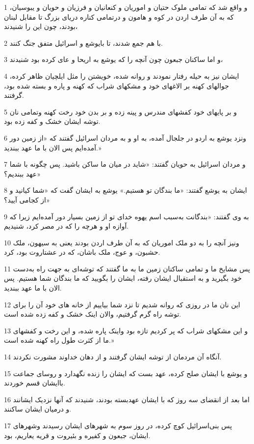 \par 1 و واقع شد که تمامی ملوک حتیان و اموریان و کنعانیان و فرزیان و حویان و یبوسیان، که به آن طرف اردن در کوه و هامون و درتمامی کناره دریای بزرگ تا مقابل لبنان بودند، چون این را شنیدند،
\par 2 با هم جمع شدند، تا بایوشع و اسرائیل متفق جنگ کنند.
\par 3 و اما ساکنان جبعون چون آنچه را که یوشع به اریحا و عای کرده بود شنیدند،
\par 4 ایشان نیز به حیله رفتار نمودند و روانه شده، خویشتن را مثل ایلچیان ظاهر کرده، جوالهای کهنه بر الاغهای خود و مشکهای شراب که کهنه و پاره و بسته شده بود، گرفتند.
\par 5 و بر پایهای خود کفشهای مندرس و پینه زده و بر بدن خود رخت کهنه وتمامی نان توشه ایشان خشک و کفه زده بود.
\par 6 ونزد یوشع به اردو در جلجال آمده، به او و به مردان اسرائیل گفتند که «از زمین دور آمده‌ایم پس الان با ما عهد ببندید.»
\par 7 و مردان اسرائیل به حویان گفتند: «شاید در میان ما ساکن باشید. پس چگونه با شما عهد ببندیم؟»
\par 8 ایشان به یوشع گفتند: «ما بندگان تو هستیم.» یوشع به ایشان گفت که «شما کیانید و از کجامی آیید؟»
\par 9 به وی گفتند: «بندگانت به‌سبب اسم یهوه خدای تو از زمین بسیار دور آمده‌ایم زیرا که آوازه او و هر‌چه را که در مصر کرد، شنیدیم.
\par 10 ونیز آنچه را به دو ملک اموریان که به آن طرف اردن بودند یعنی به سیهون، ملک حشبون، و عوج، ملک باشان، که در عشتاروت بود، کرد.
\par 11 پس مشایخ ما و تمامی ساکنان زمین ما به ما گفتند که توشه‌ای به جهت راه به‌دست خود بگیرید و به استقبال ایشان رفته، ایشان را بگویید که ما بندگان شما هستیم. پس الان با ما عهد ببندید.
\par 12 این نان ما در روزی که روانه شدیم تا نزد شما بیاییم از خانه های خود آن را برای توشه راه گرم گرفتیم، والان اینک خشک و کفه زده شده است.
\par 13 و این مشکهای شراب که پر کردیم تازه بود واینک پاره شده، و این رخت و کفشهای ما از کثرت طول راه کهنه شده است.»
\par 14 آنگاه آن مردمان از توشه ایشان گرفتند و از دهان خداوند مشورت نکردند.
\par 15 و یوشع با ایشان صلح کرده، عهد بست که ایشان را زنده نگهدارد و روسای جماعت باایشان قسم خوردند.
\par 16 اما بعد از انقضای سه روز که با ایشان عهدبسته بودند، شنیدند که آنها نزدیک ایشانند و درمیان ایشان ساکنند.
\par 17 پس بنی‌اسرائیل کوچ کرده، در روز سوم به شهرهای ایشان رسیدند وشهرهای ایشان، جبعون و کفیره و بئیروت و قریه یعاریم، بود.
